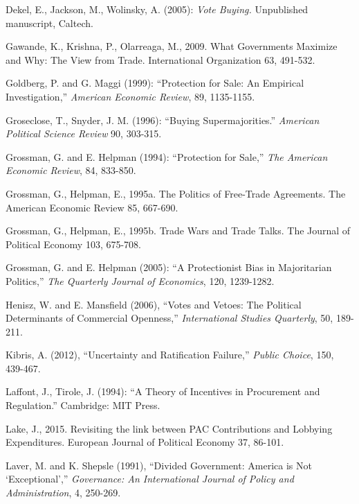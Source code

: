 \documentclass[12pt]{article}
\begin{document}
\begin{list}{}{\setlength{\leftmargin}{0.3in}\setlength{\rightmargin}{0.0in}\setlength{\itemindent}{-0.3in}\setlength{\itemsep}{0.0in}}
\item Dekel, E., Jackson, M., Wolinsky, A. (2005): {\em Vote Buying.} Unpublished manuscript, Caltech.

\item Gawande, K., Krishna, P., Olarreaga, M., 2009. What Governments Maximize and Why: The View from Trade. International Organization 63, 491-532.

\item Goldberg, P. and G. Maggi (1999): ``Protection for Sale: An Empirical Investigation,'' {\em American Economic Review}, 89, 1135-1155.

\item Groseclose, T., Snyder, J. M. (1996): ``Buying Supermajorities.'' {\em American Political Science Review} 90, 303-315.

\item Grossman, G. and E. Helpman (1994): ``Protection for Sale,'' {\em The American Economic Review}, 84, 833-850.

\item Grossman, G., Helpman, E., 1995a. The Politics of Free-Trade Agreements. The American Economic Review 85, 667-690.

\item Grossman, G., Helpman, E., 1995b. Trade Wars and Trade Talks. The Journal of Political Economy 103, 675-708.

\item Grossman, G. and E. Helpman (2005): ``A Protectionist Bias in Majoritarian Politics,'' {\em The Quarterly Journal of Economics}, 120, 1239-1282.

\item Henisz, W. and E. Mansfield (2006), ``Votes and Vetoes: The Political Determinants of Commercial Openness,'' {\em International Studies Quarterly}, 50, 189-211.

\item Kibris, A. (2012), ``Uncertainty and Ratification Failure,'' {\em Public Choice}, 150, 439-467.

\item Laffont, J., Tirole, J. (1994): ``A Theory of Incentives in Procurement and Regulation.'' Cambridge: MIT Press.

\item Lake, J., 2015. Revisiting the link between PAC Contributions and Lobbying Expenditures. European Journal of Political Economy 37, 86-101.

\item Laver, M. and K. Shepsle (1991), ``Divided Government: America is Not `Exceptional','' {\em Governance: An International Journal of Policy and Administration}, 4, 250-269.


\end{list}
\end{document}
